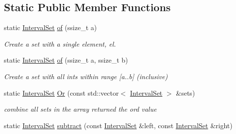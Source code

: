 \subsection*{Static Public Member Functions}
\begin{DoxyCompactItemize}
\item 
\mbox{\label{classantlr4_1_1misc_1_1IntervalSet_ad7b2791799066867e684ab8a69b78fb7}} 
static \hyperlink{classantlr4_1_1misc_1_1IntervalSet}{Interval\+Set} \hyperlink{classantlr4_1_1misc_1_1IntervalSet_ad7b2791799066867e684ab8a69b78fb7}{of} (ssize\+\_\+t a)
\begin{DoxyCompactList}\small\item\em Create a set with a single element, el. \end{DoxyCompactList}\item 
\mbox{\label{classantlr4_1_1misc_1_1IntervalSet_aab2472831ec5ecc186d1415a76a8c58c}} 
static \hyperlink{classantlr4_1_1misc_1_1IntervalSet}{Interval\+Set} \hyperlink{classantlr4_1_1misc_1_1IntervalSet_aab2472831ec5ecc186d1415a76a8c58c}{of} (ssize\+\_\+t a, ssize\+\_\+t b)
\begin{DoxyCompactList}\small\item\em Create a set with all ints within range \mbox{[}a..b\mbox{]} (inclusive) \end{DoxyCompactList}\item 
\mbox{\label{classantlr4_1_1misc_1_1IntervalSet_acdd2239e963d2d7913f4c7fd17d8afb0}} 
static \hyperlink{classantlr4_1_1misc_1_1IntervalSet}{Interval\+Set} \hyperlink{classantlr4_1_1misc_1_1IntervalSet_acdd2239e963d2d7913f4c7fd17d8afb0}{Or} (const std\+::vector$<$ \hyperlink{classantlr4_1_1misc_1_1IntervalSet}{Interval\+Set} $>$ \&sets)
\begin{DoxyCompactList}\small\item\em combine all sets in the array returned the or\textquotesingle{}d value \end{DoxyCompactList}\item 
static \hyperlink{classantlr4_1_1misc_1_1IntervalSet}{Interval\+Set} \hyperlink{classantlr4_1_1misc_1_1IntervalSet_a1a3f30153b722dd4ce77325305b6470a}{subtract} (const \hyperlink{classantlr4_1_1misc_1_1IntervalSet}{Interval\+Set} \&left, const \hyperlink{classantlr4_1_1misc_1_1IntervalSet}{Interval\+Set} \&right)
\end{DoxyCompactItemize}

